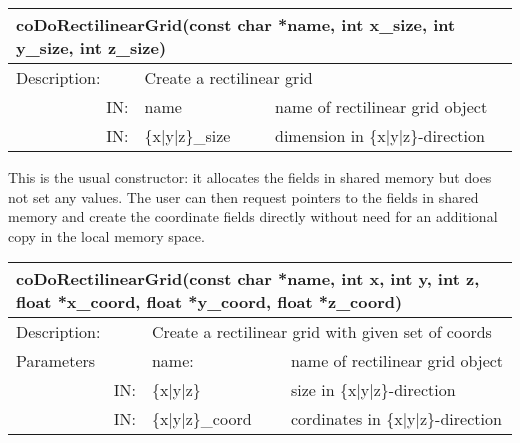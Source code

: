 \begin{htmlonly}
\begin{longtable}{|p{4cm}|p{2.5cm}|p{7cm}|}
\hline
\multicolumn{3}{|p{13.5cm}|}{\bf  coDoRectilinearGrid(const char *name, int x\_size, int y\_size, int z\_size)}\\
\hline
{Description:}  
           & \multicolumn{2}{p{9.5cm}|}{Create a rectilinear grid} \\
\hline
\multicolumn{1}{|r|}{IN:} & \multicolumn{1}{p{3cm}|}{name} 
                          & \multicolumn{1}{p{5cm}|}{name of rectilinear grid object}\\
\hline
\multicolumn{1}{|r|}{IN:} & \multicolumn{1}{p{3cm}|}{\{x|y|z\}\_size} 
                          & \multicolumn{1}{p{5cm}|}{dimension in 
			  \{x|y|z\}-direction}\endhead
\hline
\end{longtable}
\end{htmlonly}

This is the usual constructor: it allocates the fields in shared memory but does 
not set any values. The user can then request pointers to the fields in
shared memory and create the coordinate fields directly without need for an 
additional copy in the local memory space.

\latexonly
\begin{longtable}{|p{4cm}|p{2.5cm}|p{7cm}|}
\hline
\multicolumn{3}{|p{13.5cm}|}{\bf  coDoRectilinearGrid(const char *name, int x, int y, int z, 
float *x\_coord, float *y\_coord, float *z\_coord)}\\
\hline
{Description:}  
           & \multicolumn{2}{p{9.5cm}|}{Create a rectilinear grid with given set of coords} \\
\hline
{Parameters} & \multicolumn{1}{p{3cm}|}{name:} 
                          & \multicolumn{1}{p{5cm}|}{name of rectilinear grid object}\\
\hline
\multicolumn{1}{|r|}{IN:} & \multicolumn{1}{p{3cm}|}{\{x$\mid$y$\mid$z\}} 
                          & \multicolumn{1}{p{5cm}|}{size in 
			  \{x$\mid$y$\mid$z\}-direction}\\
\hline
\multicolumn{1}{|r|}{IN:} & \multicolumn{1}{p{3cm}|}{\{x$\mid$y$\mid$z\}\_coord} 
                          & \multicolumn{1}{p{5cm}|}{cordinates in 
			  \{x$\mid$y$\mid$z\}-direction}\endhead
\hline
\end{longtable}
\endlatexonly

